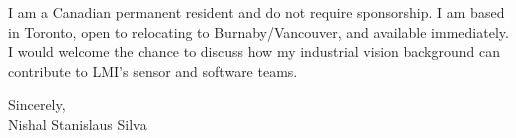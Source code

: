 \documentclass[11pt]{article}
\begin{document}
\vspace{0.5em}
\noindent I am a Canadian permanent resident and do not require sponsorship. I am based in Toronto,
open to relocating to Burnaby/Vancouver, and available immediately. I would welcome the chance to
discuss how my industrial vision background can contribute to LMI's sensor and software teams.

\vspace{1em}
\noindent Sincerely, \\
Nishal Stanislaus Silva
\end{document}
